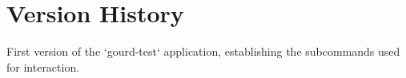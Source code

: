 \pagebreak

\section{Version History}




First version of the `gourd-test` application, establishing the subcommands used for interaction.
